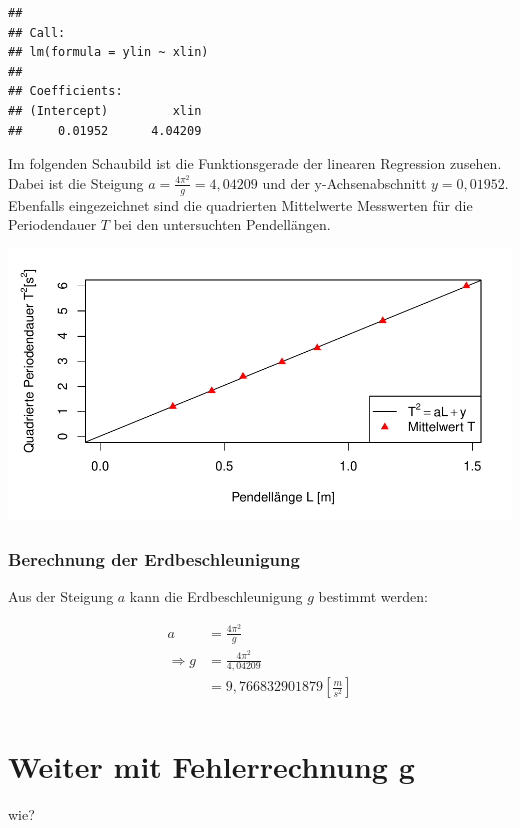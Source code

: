 \documentclass[
  9pt,
]{article}
\begin{document}
\begin{verbatim}
## 
## Call:
## lm(formula = ylin ~ xlin)
## 
## Coefficients:
## (Intercept)         xlin  
##     0.01952      4.04209
\end{verbatim}

Im folgenden Schaubild ist die Funktionsgerade der linearen Regression
zusehen. Dabei ist die Steigung \(a=\frac{4\pi^2}{g}=4,04209\) und der
y-Achsenabschnitt \(y=0,01952\). Ebenfalls eingezeichnet sind die
quadrierten Mittelwerte Messwerten für die Periodendauer \(T\) bei den
untersuchten Pendellängen.

\includegraphics{Pendel_files/figure-latex/unnamed-chunk-11-1.pdf}

\hypertarget{berechnung-der-erdbeschleunigung}{%
\subsubsection{Berechnung der
Erdbeschleunigung}\label{berechnung-der-erdbeschleunigung}}

Aus der Steigung \(a\) kann die Erdbeschleunigung \(g\) bestimmt werden:

\begin{align*}
a&= \frac{4\pi^2}{g}\\
\Rightarrow g &= \frac{4\pi^2}{4,04209}\\
 &= 9,766832901879 [\frac{m}{s^2}]\\
\end{align*}

\hypertarget{weiter-mit-fehlerrechnung-g}{%
\section{Weiter mit Fehlerrechnung
g}\label{weiter-mit-fehlerrechnung-g}}

wie?
\end{document}
